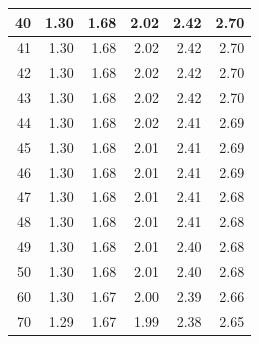\begin{center}
\begin{tabular}{r | rrr rr}
40  &  {\normalsize  1.30} & {\normalsize  1.68} & {\normalsize  2.02} & {\normalsize  2.42} & {\normalsize  2.70}  \\ 
\hline
\hline
41  &  {\normalsize  1.30} & {\normalsize  1.68} & {\normalsize  2.02} & {\normalsize  2.42} & {\normalsize  2.70}  \\ 
42  &  {\normalsize  1.30} & {\normalsize  1.68} & {\normalsize  2.02} & {\normalsize  2.42} & {\normalsize  2.70}  \\ 
43  &  {\normalsize  1.30} & {\normalsize  1.68} & {\normalsize  2.02} & {\normalsize  2.42} & {\normalsize  2.70}  \\ 
44  &  {\normalsize  1.30} & {\normalsize  1.68} & {\normalsize  2.02} & {\normalsize  2.41} & {\normalsize  2.69}  \\ 
45  &  {\normalsize  1.30} & {\normalsize  1.68} & {\normalsize  2.01} & {\normalsize  2.41} & {\normalsize  2.69}  \\ 
\hline
46  &  {\normalsize  1.30} & {\normalsize  1.68} & {\normalsize  2.01} & {\normalsize  2.41} & {\normalsize  2.69}  \\ 
47  &  {\normalsize  1.30} & {\normalsize  1.68} & {\normalsize  2.01} & {\normalsize  2.41} & {\normalsize  2.68}  \\ 
48  &  {\normalsize  1.30} & {\normalsize  1.68} & {\normalsize  2.01} & {\normalsize  2.41} & {\normalsize  2.68}  \\ 
49  &  {\normalsize  1.30} & {\normalsize  1.68} & {\normalsize  2.01} & {\normalsize  2.40} & {\normalsize  2.68}  \\ 
50  &  {\normalsize  1.30} & {\normalsize  1.68} & {\normalsize  2.01} & {\normalsize  2.40} & {\normalsize  2.68}  \\ 
\hline
\hline
60  &  {\normalsize  1.30} & {\normalsize  1.67} & {\normalsize  2.00} & {\normalsize  2.39} & {\normalsize  2.66}  \\ 
70  &  {\normalsize  1.29} & {\normalsize  1.67} & {\normalsize  1.99} & {\normalsize  2.38} & {\normalsize  2.65}  \\ 

\end{tabular}
\end{center}
